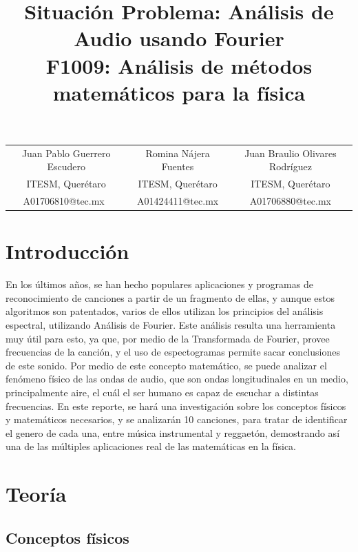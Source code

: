 \documentclass[12pt, letterpaper]{article}
\title{%
  Situación Problema: Análisis de Audio usando Fourier \\
  \large F1009: Análisis de métodos matemáticos para la física}
\begin{document}
\maketitle

\begin{tabular}{ccc}
Juan Pablo Guerrero Escudero & Romina Nájera Fuentes & Juan Braulio Olivares Rodríguez\\
ITESM, Querétaro & ITESM, Querétaro & ITESM, Querétaro\\
A01706810@tec.mx & A01424411@tec.mx & A01706880@tec.mx
\end{tabular}


\section{Introducción}
En los últimos años, se han hecho populares aplicaciones y programas de reconocimiento de 
canciones a partir de un fragmento de ellas, y aunque estos algoritmos son patentados, varios de ellos
utilizan los principios del análisis espectral, utilizando Análisis de Fourier. Este análisis
resulta una herramienta muy útil para esto, ya que, por medio de la Transformada de Fourier, provee frecuencias de 
la canción, y el uso de espectogramas permite sacar conclusiones de este sonido. Por medio de 
este concepto matemático, se puede analizar el fenómeno físico de las ondas de audio, que son ondas longitudinales 
en un medio, principalmente aire, el cuál el ser humano es capaz de escuchar a distintas frecuencias. En este reporte, se 
hará una investigación sobre los conceptos físicos y matemáticos necesarios, y se analizarán 10 canciones, para 
tratar de identificar el genero de cada una, entre música instrumental y reggaetón, demostrando así una de las múltiples aplicaciones real de las matemáticas en la física.
\section{Teoría}

\subsection{Conceptos físicos}
\end{document}

